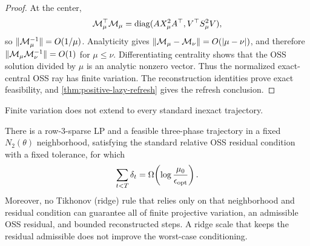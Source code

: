 \begin{proof}
At the center,
\[
 \mathcal M_\mu^\top\mathcal M_\mu
 =\operatorname{diag}(AX_\mu^2A^\top,V^\top S_\mu^2V),
\]
so $\lVert\mathcal M_\mu^{-1}\rVert=O(1/\mu)$.  Analyticity gives
$\lVert\mathcal M_\mu-\mathcal M_\nu\rVert=O(|\mu-\nu|)$, and therefore
$\lVert\mathcal M_\mu\mathcal M_\nu^{-1}\rVert=O(1)$ for $\mu\leq\nu$.
Differentiating centrality shows that the OSS solution divided by $\mu$ is an
analytic nonzero vector.  Thus the normalized exact-central OSS ray has finite
variation.  The reconstruction identities prove exact feasibility, and
\cref{thm:positive-lazy-refresh} gives the refresh conclusion.
\end{proof}

Finite variation does not extend to every standard inexact trajectory.

\begin{proposition}
\label{prop:positive-cycling-proximal}
There is a row-$3$-sparse LP and a feasible three-phase trajectory in a fixed
$N_2(\theta)$ neighborhood, satisfying the standard relative OSS residual
condition with a fixed tolerance, for which
\begin{equation}
 \sum_{t<T}\delta_t=\Omega\!\left(
 \log\frac{\mu_0}{\epsilon_{\rm opt}}\right).          \label{eq:positive-cycling}
\end{equation}
Moreover, no Tikhonov (ridge) rule that relies only on that neighborhood and
residual condition can guarantee all of finite projective variation, an
admissible OSS residual, and bounded reconstructed steps.  A ridge scale that
keeps the residual admissible does not improve the worst-case conditioning.
\end{proposition}


